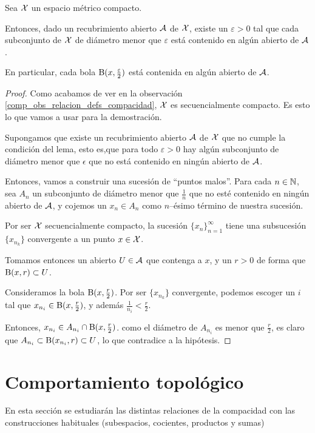 \begin{lem}[Lebesgue]
	\label{comp_lem_lebesgue}
	Sea $\mathcal{X}$ un espacio métrico compacto.
	
	Entonces, dado un recubrimiento abierto $\mathcal{A}$ de $\mathcal{X}$, existe un $\varepsilon>0$ tal que cada subconjunto de $\mathcal{X}$ de diámetro menor que $\varepsilon$ está contenido en algún abierto de $\mathcal{A}$.
	
	En particular, cada bola $\operatorname{B}(x,\frac{\varepsilon}{2})$ está contenida en algún abierto de $\mathcal{A}$.
\end{lem}
\begin{proof}
	Como acabamos de ver en la observación \ref{comp_obs_relacion_defs_compacidad}, $\mathcal{X}$ es secuencialmente compacto. Es esto lo que vamos a usar para la demostración.
	
	Supongamos que existe un recubrimiento abierto $\mathcal{A}$ de $\mathcal{X}$ que no cumple la condición del lema, esto es,que para todo $\varepsilon > 0$ hay algún subconjunto de diámetro menor que $\epsilon$ que no está contenido en ningún abierto de $\mathcal{A}$.
	
	Entonces, vamos a construir una sucesión de ``puntos malos''. Para cada $n\in\mathbb{N}$, sea $A_n$ un subconjunto de diámetro menor que $\frac{1}{n}$ que no esté contenido en ningún abierto de $\mathcal{A}$, y cojemos un $x_n\in A_n$ como $n$--ésimo término de nuestra sucesión.
	
	Por ser $\mathcal{X}$ secuencialmente compacto, la sucesión $\{x_n\}_{n=1}^\infty$ tiene una subsucesión $\{x_{n_k}\}$ convergente a un punto $x\in\mathcal{X}$.
	
	Tomamos entonces un abierto $U\in\mathcal{A}$ que contenga a $x$, y un $r>0$ de forma que $\operatorname{B}(x,r)\subset U$.
	
	Consideramos la bola $\operatorname{B}(x,\frac{r}{2})$. Por ser $\{x_{n_k}\}$ convergente, podemos escoger un $i$ tal que $x_{n_i}\in\operatorname{B}(x,\frac{r}{2})$, y además  $\frac{1}{n_i}<\frac{r}{2}$.
	
	Entonces, $x_{n_i}\in A_{n_i}\cap\operatorname{B}(x,\frac{r}{2})$. como el diámetro de $A_{n_i}$ es menor que $\frac{r}{2}$, es claro que  $A_{n_i}\subset\operatorname{B}(x_{n_i},r)\subset U$, lo que contradice a la hipótesis.
\end{proof}
\section{Comportamiento topológico}
En esta sección se estudiarán las distintas relaciones de la compacidad con las construcciones habituales (subespacios, cocientes, productos y sumas)

